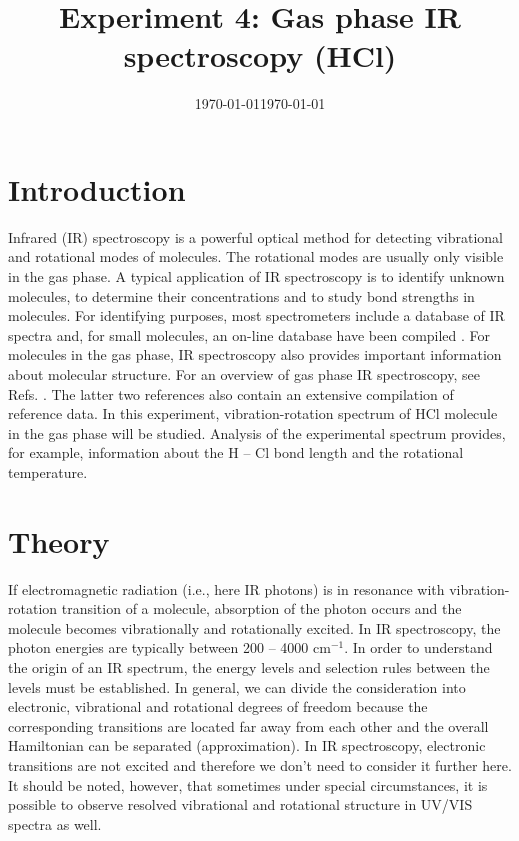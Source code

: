 \documentclass[byrevtex,amssymb,aps,pra,floatfix,letterpaper]{revtex4}
\date{\today}
\begin{document}
\title{Experiment 4: Gas phase IR spectroscopy (HCl)}

\date{\today}

\maketitle

\section{Introduction}

Infrared (IR) spectroscopy is a powerful optical method for detecting vibrational and rotational modes of molecules. The rotational modes are usually only visible in the gas phase. A typical application of IR spectroscopy is to identify unknown molecules, to determine their concentrations and to study bond strengths in molecules. For identifying purposes, most spectrometers include a database of IR spectra and, for small molecules, an on-line database have been compiled \cite{webbook}. For molecules in the gas phase, IR spectroscopy also provides important information about molecular structure. For an overview of gas phase IR spectroscopy, see Refs. \cite{SILBEY,ATKINS1,HERZBERG1,HERZBERG2}. The latter two references also contain an extensive compilation of reference data. In this experiment, vibration-rotation spectrum of HCl molecule in the gas phase will be studied. Analysis of the experimental spectrum provides, for example, information about the H -- Cl bond length and the rotational temperature.

\section{Theory}

If electromagnetic radiation (i.e., here IR photons) is in resonance with vibration-rotation transition of a molecule, absorption of the photon occurs and the molecule becomes vibrationally and rotationally excited. In IR spectroscopy, the photon energies are typically between 200 -- 4000 cm$^{-1}$. In order to understand the origin of an IR spectrum, the energy levels and selection rules between the levels must be established. In general, we can divide the consideration into electronic, vibrational and rotational degrees of freedom because the corresponding transitions are located far away from each other and the overall Hamiltonian can be separated (approximation). In IR spectroscopy, electronic transitions are not excited and therefore we don't need to consider it further here. It should be noted, however, that sometimes under special circumstances, it is possible to observe resolved vibrational and rotational structure in UV/VIS spectra as well.
\end{document}
